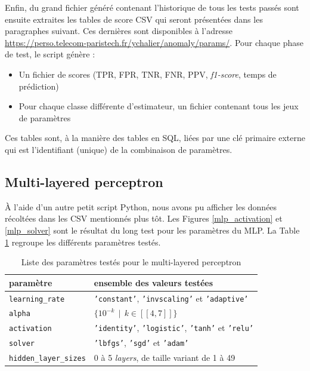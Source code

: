 \documentclass[a4paper]{report}
\begin{document}
Enfin, du grand fichier généré contenant l'historique de tous les tests passés sont ensuite extraites les tables de score CSV qui seront présentées dans les paragraphes suivant. Ces dernières sont disponibles à l'adresse \url{https://perso.telecom-paristech.fr/ychalier/anomaly/params/}. Pour chaque phase de test, le script génère :
\begin{itemize}
\item Un fichier de scores (TPR, FPR, TNR, FNR, PPV, \emph{f1-score}, temps de prédiction)
\item Pour chaque classe différente d'estimateur, un fichier contenant tous les jeux de paramètres
\end{itemize}
Ces tables sont, à la manière des tables en SQL, liées par une clé primaire externe qui est l'identifiant (unique) de la combinaison de paramètres.


\subsection{Multi-layered perceptron}

À l'aide d'un autre petit script Python, nous avons pu afficher les données récoltées dans les CSV mentionnés plus tôt. Les Figures \ref{mlp_activation} et \ref{mlp_solver} sont le résultat du long test pour les paramètres du MLP. La Table \ref{params_mlp} regroupe les différents paramètres testés.

\begin{table}[h]
\centering
\begin{tabular}{ll}
paramètre & ensemble des valeurs testées \\
\hline
\texttt{learning\_rate} & \texttt{'constant'}, \texttt{'invscaling'} et \texttt{'adaptive'}\\
\texttt{alpha} & $\{10^{-k} \>\> | \>\> k \in [\![4, 7]\!] \}$ \\
\texttt{activation} & \texttt{'identity'}, \texttt{'logistic'}, \texttt{'tanh'} et \texttt{'relu'} \\
\texttt{solver} & \texttt{'lbfgs'}, \texttt{'sgd'} et \texttt{'adam'}\\
\texttt{hidden\_layer\_sizes} & 0 à 5 \emph{layers}, de taille variant de 1 à 49\\
\end{tabular}
\caption{Liste des paramètres testés pour le multi-layered perceptron\label{params_mlp}}
\end{table}
\end{document}
